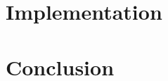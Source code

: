 \documentclass{llncs}
\begin{document}
\section{Implementation}\label{sec:impl}

\section{Conclusion}\label{sec:conclusion}






\end{document}
